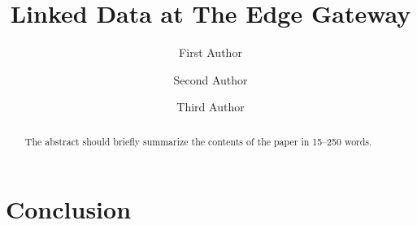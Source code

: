 \documentclass[runningheads]{llncs}
\begin{document}
%
\title{Linked Data at The Edge Gateway}
%
%
\author{First Author \and
Second Author \and
Third Author}
%
%
%
\maketitle              %
%
\begin{abstract}
The abstract should briefly summarize the contents of the paper in
15--250 words.

\end{abstract}






\section{Conclusion}
\end{document}
